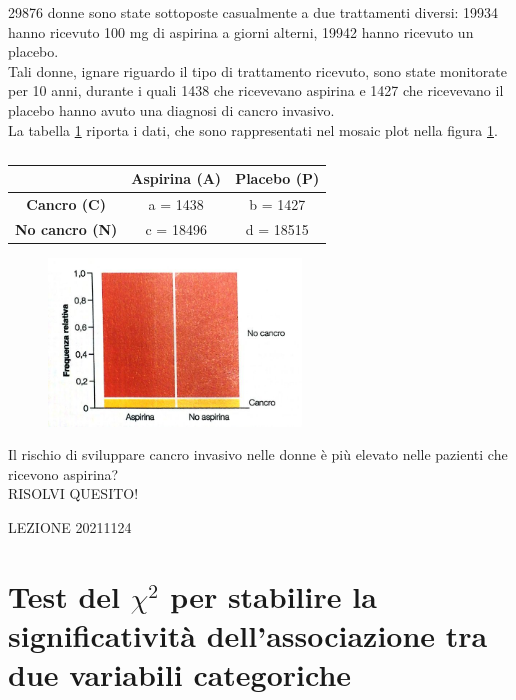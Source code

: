 \documentclass[10pt, draft]{book}
\newcounter{example}[section]
\begin{document}
\begin{example}
29876 donne sono state sottoposte casualmente a due trattamenti diversi: 19934 hanno ricevuto 100 mg di aspirina a giorni alterni, 19942 hanno ricevuto un placebo.
\\
Tali donne, ignare riguardo il tipo di trattamento ricevuto, sono state monitorate per 10 anni, durante i quali 1438 che ricevevano aspirina e 1427 che ricevevano il placebo hanno avuto una diagnosi di cancro invasivo.
\\
La tabella \ref{tabaspirina} riporta i dati, che sono rappresentati nel mosaic plot nella figura \ref{fig9.2-1}.
\begin{table}[H]
        \centering
        \renewcommand\arraystretch{1.2}
        \begin{tabular}{c|c|c}
        \hline
         & \textbf{Aspirina (A)} & \textbf{Placebo (P)}\\
        \hline
        \textbf{Cancro (C)} & a = 1438 & b = 1427 \\
        \hline
        \textbf{No cancro (N)} & c = 18496 & d = 18515\\
        \hline
        \end{tabular}
        \caption{}
        \label{tabaspirina}
\end{table}\noindent
    \begin{figure}[H]\label{fig9.2-1}
    \centering
    \includegraphics[width=0.6\textwidth]{fig9.2-1.png}
    \caption{\small{}}
    \end{figure}
    Il rischio di sviluppare cancro invasivo nelle donne è più elevato nelle pazienti che ricevono aspirina?
    \\
    RISOLVI QUESITO!
\end{example}

\begin{example}
LEZIONE 20211124
\end{example}

\section{Test del \texorpdfstring{$\chi^2$}{Lg} per stabilire la significatività dell'associazione tra due variabili categoriche}
\end{document}

